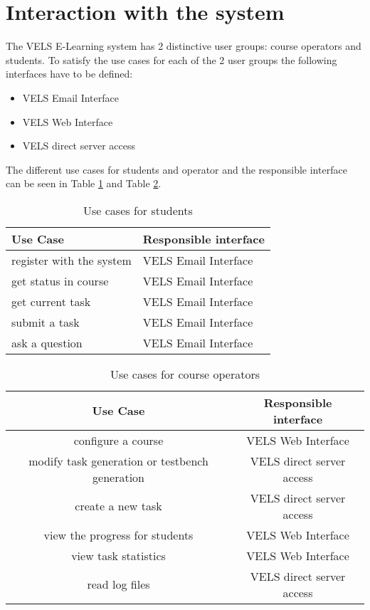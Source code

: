 \section{Interaction with the system}\label{interactions}
The VELS E-Learning system has 2 distinctive user groups: course operators and students. 
To satisfy the use cases for each of the 2 user groups the following interfaces have
to be defined:
\begin{itemize}
\item VELS Email Interface
\item VELS Web Interface
\item VELS direct server access
\end{itemize} 

The different use cases for students and operator and the responsible interface can be seen in 
Table \ref{tab:usestudent} and Table \ref{tab:useoperator}.

\begin{table}[h]
\centering
\begin{tabular}{||l | l||} 
    \hline
    Use Case & Responsible interface \\ [0.5ex] 
    \hline\hline
    register with the system & VELS Email Interface
    \\
    \hline
    get status in course & VELS Email Interface 
    \\
    \hline
    get current task & VELS Email Interface 
    \\
    \hline
    submit a task & VELS Email Interface
    \\
    \hline
    ask a question & VELS Email Interface
    \\
    \hline
\end{tabular}
\caption{Use cases for students}
\label{tab:usestudent}
\end{table}


\begin{table}[h]
\centering
\begin{tabular}{||c | c||} 
    \hline
    Use Case & Responsible interface \\ [0.5ex] 
     \hline\hline
    configure a course & VELS Web Interface
    \\
    \hline
    modify task generation or testbench generation & VELS direct server access
    \\
    \hline
    create a new task & VELS direct server access
    \\
    \hline
    view the progress for students & VELS Web Interface
    \\
    \hline
    view task statistics & VELS Web Interface
    \\
    \hline
    read log files & VELS direct server access 
    \\
    \hline
\end{tabular}
\caption{Use cases for course operators}
\label{tab:useoperator}
\end{table}

